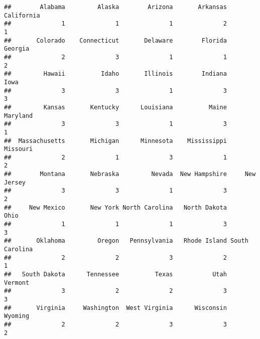 \documentclass[]{article}
\newenvironment{Shaded}{\begin{snugshade}}{\end{snugshade}}
\newcommand{\KeywordTok}[1]{\textcolor[rgb]{0.13,0.29,0.53}{\textbf{#1}}}
\newcommand{\DataTypeTok}[1]{\textcolor[rgb]{0.13,0.29,0.53}{#1}}
\newcommand{\DecValTok}[1]{\textcolor[rgb]{0.00,0.00,0.81}{#1}}
\newcommand{\StringTok}[1]{\textcolor[rgb]{0.31,0.60,0.02}{#1}}
\newcommand{\CommentTok}[1]{\textcolor[rgb]{0.56,0.35,0.01}{\textit{#1}}}
\newcommand{\OperatorTok}[1]{\textcolor[rgb]{0.81,0.36,0.00}{\textbf{#1}}}
\newcommand{\NormalTok}[1]{#1}
\begin{document}
\begin{verbatim}
##        Alabama         Alaska        Arizona       Arkansas     California 
##              1              1              1              2              1 
##       Colorado    Connecticut       Delaware        Florida        Georgia 
##              2              3              1              1              2 
##         Hawaii          Idaho       Illinois        Indiana           Iowa 
##              3              3              1              3              3 
##         Kansas       Kentucky      Louisiana          Maine       Maryland 
##              3              3              1              3              1 
##  Massachusetts       Michigan      Minnesota    Mississippi       Missouri 
##              2              1              3              1              2 
##        Montana       Nebraska         Nevada  New Hampshire     New Jersey 
##              3              3              1              3              2 
##     New Mexico       New York North Carolina   North Dakota           Ohio 
##              1              1              1              3              3 
##       Oklahoma         Oregon   Pennsylvania   Rhode Island South Carolina 
##              2              2              3              2              1 
##   South Dakota      Tennessee          Texas           Utah        Vermont 
##              3              2              2              3              3 
##       Virginia     Washington  West Virginia      Wisconsin        Wyoming 
##              2              2              3              3              2
\end{verbatim}

\begin{Shaded}
\end{Shaded}
\end{document}
